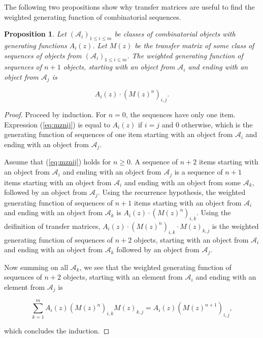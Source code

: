 \documentclass{article}
\newtheorem{proposition}{Proposition}
\begin{document}
The following two propositions show why transfer matrices are useful to
find the weighted generating function of combinatorial sequences.

\begin{proposition}
\label{th:transfermatrices}
Let $(\mathcal{A}_i)_{1 \leq i \leq m}$ be classes of combinatorial
objects with generating functions $A_i(z)$. Let $M(z)$ be the transfer
matrix of some class of sequences of objects from $(\mathcal{A}_i)_{1 \leq
i \leq m}$. The weighted generating function of sequences of $n+1$
objects, starting with an object from $\mathcal{A}_i$ and ending with an
object from $\mathcal{A}_j$ is

\begin{equation}
\label{eq:mznij}
A_i(z) \cdot \left( M(z)^n \right)_{i,j}.
\end{equation}

\end{proposition}

\begin{proof}
Proceed by induction. For $n = 0$, the sequences have only one item.
Expression (\ref{eq:mznij}) is equal to $A_i(z)$ if $i = j$ and $0$
otherwise, which is the generating function of sequences of one item
starting with an object from $\mathcal{A}_i$ and ending with an object
from $\mathcal{A}_j$.

Assume that (\ref{eq:mznij}) holds for $n \geq 0$. A sequence of $n+2$
items starting with an object from $\mathcal{A}_i$ and ending with an
object from $\mathcal{A}_j$ is a sequence of $n+1$ items starting with an
object from $\mathcal{A}_i$ and ending with an object from some
$\mathcal{A}_k$, followed by an object from $\mathcal{A}_j$. Using the
recurrence hypothesis, the weighted generating function of sequences of
$n+1$ items starting with an object from $\mathcal{A}_i$ and ending with
an object from $\mathcal{A}_k$ is $A_i(z) \cdot (M(z)^n)_{i,k}$. Using the
deifinition of transfer matrices, $A_i(z) \cdot (M(z)^n)_{i,k} \cdot
M(z)_{k,j}$ is the weighted generating function of sequences of $n+2$
objects, starting with an object from $\mathcal{A}_i$ and ending with an
object from $\mathcal{A}_k$ followed by an object from $\mathcal{A}_j$.

Now summing on all $\mathcal{A}_k$, we see that the weighted generating
function of sequences of $n+2$ objects, starting with an element from
$\mathcal{A}_i$ and ending with an element from $\mathcal{A}_j$ is

\begin{equation*}
\sum_{k = 1}^m A_i(z)\left( M(z)^n \right)_{i,k} M(z)_{k,j} 
 = A_i(z) \left( M(z)^{n+1} \right)_{i,j},
\end{equation*}

\noindent
which concludes the induction.
\end{proof}
\end{document}
